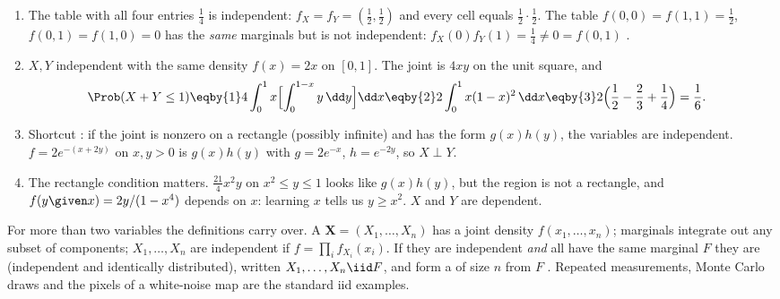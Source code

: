 \label{1b:ex:independence}
\begin{enumerate}[label=(\alph*),leftmargin=1.6em,itemsep=2pt]
  \item The table with all four entries $\tfrac14$ is independent:
        $f_X=f_Y=(\tfrac12,\tfrac12)$ and every cell equals
        $\tfrac12\cdot\tfrac12$. The table $f(0,0)=f(1,1)=\tfrac12$,
        $f(0,1)=f(1,0)=0$ has the \emph{same} marginals but is not independent:
        $f_X(0)f_Y(1)=\tfrac14\ne0=f(0,1)$ .
  \item $X,Y$ independent with the same density $f(x)=2x$ on $[0,1]$. The
        joint is $4xy$ on the unit square, and 
        \begin{align*}
          \Prob(X+Y\le1)
          &\eqby{1} 4\int_0^1x\Bigl[\int_0^{1-x}y\,\dd y\Bigr]\dd x
           \eqby{2} 2\int_0^1x(1-x)^2\,\dd x
           \eqby{3} 2\Bigl(\frac12-\frac23+\frac14\Bigr)=\frac16 .
        \end{align*}
  \item Shortcut : if the joint is nonzero on a
        rectangle (possibly infinite) and has the form $g(x)h(y)$, the
        variables are independent. $f=2e^{-(x+2y)}$ on $x,y>0$ is
        $g(x)h(y)$ with $g=2e^{-x}$, $h=e^{-2y}$, so $X\perp Y$.
  \item The rectangle condition matters. $\tfrac{21}{4}x^2y$ on $x^2\le y\le1$
        looks like $g(x)h(y)$, but the region is not a rectangle, and
        $f(y\given x)=2y/(1-x^4)$ depends on $x$: learning $x$ tells us $y\ge
        x^2$. $X$ and $Y$ are dependent.
\end{enumerate}

For more than two variables the definitions carry over. A
 $\bm X=(X_1,\dots,X_n)$ has a joint density
$f(x_1,\dots,x_n)$; marginals integrate out any subset of components;
$X_1,\dots,X_n$ are independent if $f=\prod_if_{X_i}(x_i)$. If they are
independent \emph{and} all have the same marginal $F$ they are
 (independent and identically distributed), written
$X_1,\dots,X_n\iid F$, and form a  of size $n$ from
$F$ . Repeated measurements, Monte Carlo draws and
the pixels of a white-noise map are the standard iid examples.

